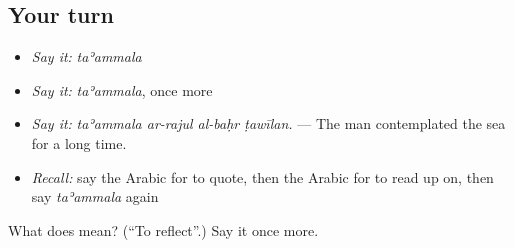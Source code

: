 \subsection*{Your turn}
\begin{itemize}
\raggedright
  \item \emph{Say it:} \emph{taʾammala}
  \item \emph{Say it:} \emph{taʾammala}, once more
  \item \emph{Say it:} \emph{taʾammala ar-rajul al-baḥr ṭawīlan.} — The man contemplated the sea for a long time.
  \item \emph{Recall:} say the Arabic for to quote, then the Arabic for to read up on, then say \emph{taʾammala} again
\end{itemize}

\begin{tcolorbox}[breakable,colback=teal!4,colframe=teal!35!black,title={Before you move on}]
What does  mean? (\textquotedblleft{}To reflect\textquotedblright{}.) Say it once more.
\end{tcolorbox}
